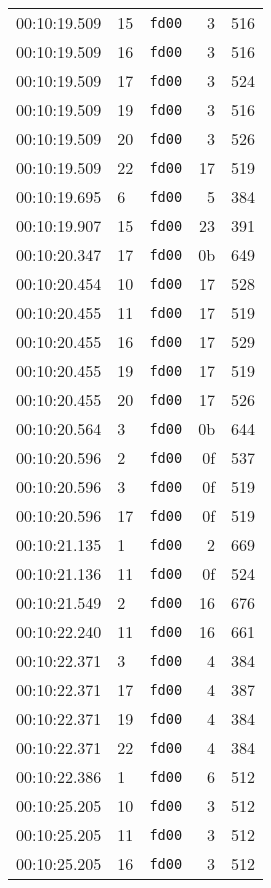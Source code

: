 \documentclass{article}
\begin{document}
\begin{longtable}{lllrr}
00:10:19.509 & 15 & \texttt{fd00} & 3 & 516 \\
00:10:19.509 & 16 & \texttt{fd00} & 3 & 516 \\
00:10:19.509 & 17 & \texttt{fd00} & 3 & 524 \\
00:10:19.509 & 19 & \texttt{fd00} & 3 & 516 \\
00:10:19.509 & 20 & \texttt{fd00} & 3 & 526 \\
00:10:19.509 & 22 & \texttt{fd00} & 17 & 519 \\
00:10:19.695 & 6 & \texttt{fd00} & 5 & 384 \\
00:10:19.907 & 15 & \texttt{fd00} & 23 & 391 \\
00:10:20.347 & 17 & \texttt{fd00} & 0b & 649 \\
00:10:20.454 & 10 & \texttt{fd00} & 17 & 528 \\
00:10:20.455 & 11 & \texttt{fd00} & 17 & 519 \\
00:10:20.455 & 16 & \texttt{fd00} & 17 & 529 \\
00:10:20.455 & 19 & \texttt{fd00} & 17 & 519 \\
00:10:20.455 & 20 & \texttt{fd00} & 17 & 526 \\
00:10:20.564 & 3 & \texttt{fd00} & 0b & 644 \\
00:10:20.596 & 2 & \texttt{fd00} & 0f & 537 \\
00:10:20.596 & 3 & \texttt{fd00} & 0f & 519 \\
00:10:20.596 & 17 & \texttt{fd00} & 0f & 519 \\
00:10:21.135 & 1 & \texttt{fd00} & 2 & 669 \\
00:10:21.136 & 11 & \texttt{fd00} & 0f & 524 \\
00:10:21.549 & 2 & \texttt{fd00} & 16 & 676 \\
00:10:22.240 & 11 & \texttt{fd00} & 16 & 661 \\
00:10:22.371 & 3 & \texttt{fd00} & 4 & 384 \\
00:10:22.371 & 17 & \texttt{fd00} & 4 & 387 \\
00:10:22.371 & 19 & \texttt{fd00} & 4 & 384 \\
00:10:22.371 & 22 & \texttt{fd00} & 4 & 384 \\
00:10:22.386 & 1 & \texttt{fd00} & 6 & 512 \\
00:10:25.205 & 10 & \texttt{fd00} & 3 & 512 \\
00:10:25.205 & 11 & \texttt{fd00} & 3 & 512 \\
00:10:25.205 & 16 & \texttt{fd00} & 3 & 512 \\

\end{longtable}
\end{document}
